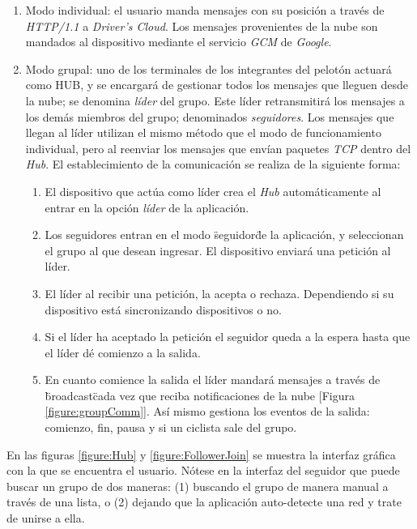 \begin{enumerate}
	\item Modo individual: el usuario manda mensajes con su posición a través de
	\emph{HTTP/1.1} a \emph{Driver's Cloud}. Los mensajes provenientes de la nube
	son mandados al dispositivo mediante el servicio \emph{GCM} de \emph{Google}.

	\item Modo grupal: uno de los terminales de los integrantes del pelotón actuará
	como HUB, y se encargará de	gestionar todos los mensajes que lleguen desde la
	nube; se denomina \emph{líder} del grupo. Este líder retransmitirá los mensajes
	a los demás miembros del grupo; denominados \emph{seguidores}. Los mensajes que
	llegan al líder utilizan el mismo método que el modo de funcionamiento individual,
	pero al reenviar los mensajes que envían paquetes \emph{TCP} dentro del
	\emph{Hub}. El establecimiento de la comunicación se realiza de la siguiente
	forma:

	\begin{enumerate}
		\item El dispositivo que actúa como líder crea el \emph{Hub} automáticamente
		al entrar en la opción \emph{líder} de la aplicación.

		\item Los seguidores entran en el modo \"seguidor\" de la aplicación, y seleccionan
		el grupo al que desean ingresar. El dispositivo enviará una petición al líder.

		\item El líder al recibir una petición, la acepta o rechaza. Dependiendo si
		su dispositivo está sincronizando dispositivos o no.

		\item Si el líder ha aceptado la petición el seguidor queda a la espera hasta
		que el líder dé comienzo a la salida.

		\item En cuanto comience la salida el líder mandará mensajes a través de \"broadcast\"
		cada vez que reciba notificaciones de la nube [Figura \ref{figure:groupComm}]. Así mismo
		gestiona los eventos de la salida: comienzo, fin, pausa y si un ciclista sale del grupo.
	\end{enumerate}
\end{enumerate}

En las figuras \ref{figure:Hub} y \ref{figure:FollowerJoin} se muestra la interfaz
gráfica con la que se encuentra el usuario. Nótese en la interfaz del seguidor
que puede buscar un grupo de dos maneras: (1) buscando el grupo de manera manual
a través de una lista, o (2) dejando que la aplicación auto-detecte una red y trate
de unirse a ella.

